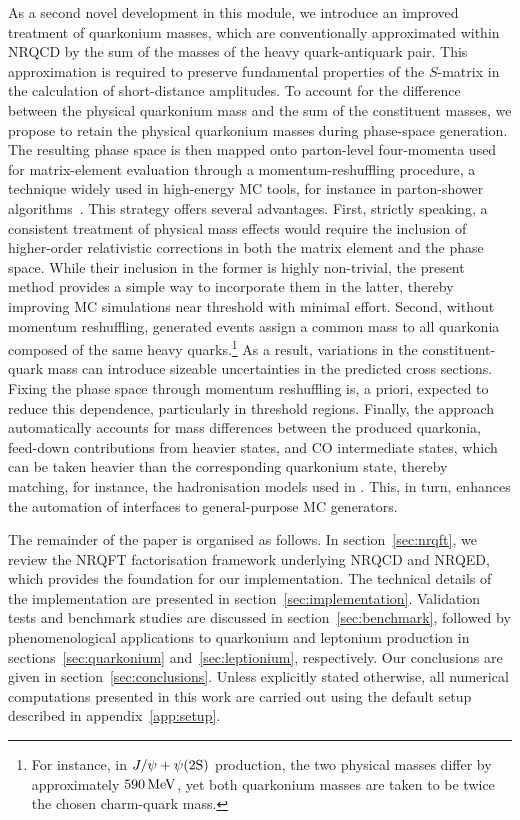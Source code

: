 As a second novel development in this module, we introduce an improved treatment of quarkonium masses, which are conventionally approximated within NRQCD by the sum of the masses of the heavy quark-antiquark pair. 
This approximation is required to preserve fundamental properties of the $S$-matrix in the calculation of short-distance amplitudes.
To account for the difference between the physical quarkonium mass and the sum of the constituent masses, we propose to retain the physical quarkonium masses during phase-space generation. The resulting phase space is then mapped onto parton-level four-momenta used for matrix-element evaluation through a momentum-reshuffling procedure, a technique widely used in high-energy MC tools, for instance in parton-shower algorithms~\cite{Bengtsson:1987kr,Marchesini:1987cf}. This strategy offers several advantages. 
First, strictly speaking, a consistent treatment of physical mass effects would require the inclusion of higher-order relativistic corrections in both the matrix element and the phase space. While their inclusion in the former is highly non-trivial, the present method provides a simple way to incorporate them in the latter, thereby improving MC simulations near threshold with minimal effort. Second, without momentum reshuffling, generated events assign a common mass to all quarkonia composed of the same heavy quarks.\footnote{For instance, in $J/\psi + \psi(2\mathrm{S})$ production, the two physical masses differ by approximately $590\,{\rm MeV}$, yet both quarkonium masses are taken to be twice the chosen charm-quark mass.} As a result, variations in the constituent-quark mass can introduce sizeable uncertainties in the predicted cross sections. Fixing the phase space through momentum reshuffling is, a priori, expected to reduce this dependence, particularly in threshold regions. Finally, the approach automatically accounts for mass differences between the produced quarkonia, feed-down contributions from heavier states, and CO intermediate states, which can be taken heavier than the corresponding quarkonium state, thereby matching, for instance, the hadronisation models used in . This, in turn, enhances the automation of interfaces to general-purpose MC generators.

The remainder of the paper is organised as follows. In section~\ref{sec:nrqft}, we review the NRQFT factorisation framework underlying NRQCD and NRQED, which provides the foundation for our implementation. The technical details of the implementation are presented in section~\ref{sec:implementation}. Validation tests and benchmark studies are discussed in section~\ref{sec:benchmark}, followed by phenomenological applications to quarkonium and leptonium production in sections~\ref{sec:quarkonium} and~\ref{sec:leptionium}, respectively. Our conclusions are given in section~\ref{sec:conclusions}. Unless explicitly stated otherwise, all numerical computations presented in this work are carried out using the default setup described in appendix~\ref{app:setup}.